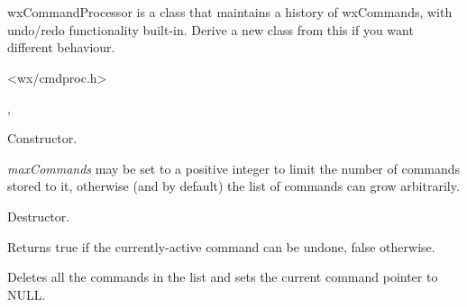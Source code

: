 \section{}\label{wxcommandprocessor}

wxCommandProcessor is a class that maintains a history of wxCommands,
with undo/redo functionality built-in. Derive a new class from this
if you want different behaviour.




<wx/cmdproc.h>


, 



\label{wxcommandprocessorctor}


Constructor.

{\it maxCommands} may be set to a positive integer to limit the number of
commands stored to it, otherwise (and by default) the list of commands can grow
arbitrarily.


\label{wxcommandprocessordtor}


Destructor.


\label{wxcommandprocessorcanundo}


Returns true if the currently-active command can be undone, false otherwise.


\label{wxcommandprocessorclearcommands}


Deletes all the commands in the list and sets the current command pointer to NULL.


\label{wxcommandprocessorredo}


